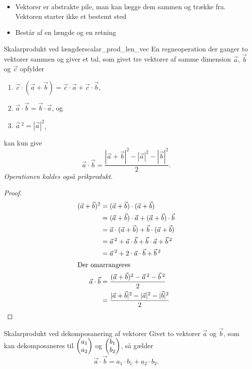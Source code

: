 \documentclass{article}
\begin{document}
\begin{itemize}
	\item Vektorer er abstrakte pile, man kan lægge dem sammen og trække fra.
		Vektoren starter ikke et bestemt sted
	\item Består af en længde og en retning
\end{itemize}
\begin{theorem}{Skalarprodukt ved længder}{scalar_prod_len_vec}
	En regneoperation der ganger to vektorer sammen og giver et tal, som givet
	tre vektorer af samme dimension $\vec{a}$, $\vec{b}$ og $\vec{c}$ opfylder
	\begin{enumerate}
		\item $\vec{c} \cdot (\vec{a} + \vec{b}) = \vec{c} \cdot \vec{a} + \vec{c} \cdot \vec{b}$,
		\item $\vec{a} \cdot \vec{b} = \vec{b} \cdot \vec{a}$, og
		\item $\vec{a}\,^2 = |\vec{a}|^2$,
	\end{enumerate}
	kan kun give
	\[
		\vec{a} \cdot \vec{b} = \frac{|\vec{a} + \vec{b}|^2 - |\vec{a}|^2 - |\vec{b}|^2}{2}.
	\] 
	\textit{Operationen kaldes også prikprodukt}.
\end{theorem}
\begin{proof}
\begin{align*}
	(\vec{a} + \vec{b})^2 &= (\vec{a} + \vec{b}) \cdot (\vec{a} + \vec{b})\\
						  &= (\vec{a} + \vec{b}) \cdot \vec{a} + (\vec{a} + \vec{b}) \cdot \vec{b}\\
						  &= \vec{a} \cdot (\vec{a} + \vec{b}) + \vec{b} \cdot (\vec{a} + \vec{b})\\
						  &= \vec{a}\,^2 + \vec{a} \cdot \vec{b} + \vec{b} \cdot \vec{a} + \vec{b}\,^2\\
						  &= \vec{a}\,^2 + 2 \cdot \vec{a} \cdot \vec{b} + \vec{b}\,^2\\
						  \intertext{Der omarrangeres}
	\vec{a} \cdot \vec{b} &= \frac{(\vec{a} + \vec{b})^2 - \vec{a}\,^2 - \vec{b}\,^2}{2}\\
						  &= \frac{|\vec{a} + \vec{b}|^2 - |\vec{a}|^2 - |\vec{b}|^2}{2}\qedhere
\end{align*}
\end{proof}

\begin{theorem}{Skalarprodukt ved dekomposanering af vektorer}{}
	Givet to vektorer $\vec{a}$ og $\vec{b}$, som kan dekomposaneres til $ \begin{pmatrix} a_1\\ a_2 \end{pmatrix} $ og $ \begin{pmatrix} b_1\\ b_2 \end{pmatrix} $, så gælder
	\[
		\vec{a} \cdot \vec{b} = a_1 \cdot b_1 + a_2 \cdot b_2.
	\] 
\end{theorem}
\end{document}
